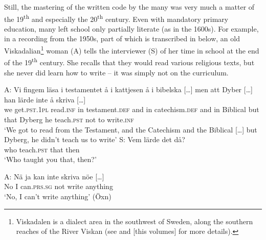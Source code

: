 \documentclass[output=paper]{langscibook}
\begin{document}
Still, the mastering of the written code by the many was very much a matter of the 19\textsuperscript{th} and especially the 20\textsuperscript{th} century. Even with mandatory primary education, many left school only partially literate (as in the 1600s). For example, in a recording from the 1950s, part of which is transcribed in  below, an old Viskadalian\footnote{Viskadalen is a dialect area in the southwest of Sweden, along the southern reaches of the River Viskan (see \citealt{Petzell2017,Petzell2018, Petzell2017} and \citeyear{chapters/07} [this volumes] for more details).} woman (A) tells the interviewer (S) of her time in school at the end of the 19\textsuperscript{th} century. She recalls that they would read various religious texts, but she never did learn how to write – it was simply not on the curriculum.


\ea \label{ex:intro:4}
\ea
\gll A:    Vi   fingem         läsa       i     testamentet     å     i     kattjesen å     i     bibelska […] men att   Dyber […] han lärde inte   å   skriva […]\\
we   get.\textsc{pst.1pl}  read.\textsc{inf} in   testament.\textsc{def} and   in   catechism.\textsc{def} and   in   Biblical          but   that Dyberg       he   teach.\textsc{pst} not   to   write\textsc{.inf}\\
    \glt `We got to read from the Testament, and the Catechism and the Biblical […] but Dyberg, he didn’t teach us to write’
\ex
\gll S:     Vem   lärde       det   då?\\
      who    teach.\textsc{pst}  that  then\\
    \glt `Who taught you that, then?’

\gll A:   Nä   ja   kan           inte     skriva     nöe […]\\
  No  I  can\textsc{.prs.sg}   not  write   anything  \\
    \glt `No, I can’t write anything’ (Öxn)
\z
\z
\end{document}
